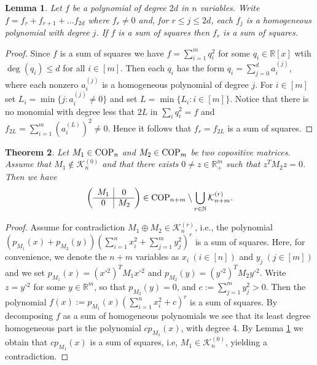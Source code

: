 \documentclass[11pt]{article}
\newcommand{\oR}{{\mathbb R}}
\newtheorem{theorem}{Theorem}[section]
\newtheorem{lemma}[theorem]{Lemma}
\numberwithin{equation}{section}
\newcommand{\COP}{{\text{\rm COP}}}
\newcommand{\MK}{{\mathcal K}}
\begin{document}
\begin{lemma}\label{least-degree} Let $f$ be a polynomial of degree $2d$ in $n$ variables. Write  $f=f_r+f_{r+1}+\dots f_{2d}$ where $f_r\ne 0$ and, for $r\le j\le 2d$, each $f_j$ is a homogeneous polynomial with degree $j$.  If $f$ is a sum of squares then $f_r$ is a sum of squares.
\end{lemma}

\begin{proof}
Since $f$ is a sum of squares we have $f=\sum_{i=1}^{m}q_i^2$ for some $q_i\in \mathbb{R}[x]$ wtih $\deg(q_i)\leq d$ for all $i\in [m]$. Then each $q_i$ has the form 
$q_i=\sum_{j=0}^{d}a_i^{(j)}$, where each nonzero $a_i^{(j)}$ is a homogeneous polynomial of degree $j$. For $i\in [m]$ set $L_i=\min\{ j: a_i^{(j)} \neq 0\} $ and set $L=\min\{L_i:  i\in [m]\}$. Notice that there is no monomial with degree less that $2L$  in $\sum_iq_i^2=f$ and 
$f_{2L} = \sum_{i=1}^{m}(a_i^{(L)})^2 \neq 0 $. Hence it follows that $f_r=f_{2L}$ is a sum of squares. 
\end{proof}


\begin{theorem}\label{theo-cop}
Let $M_1\in \COP_n$ and $M_2\in \COP_m$ be two copositive matrices. Assume that $M_1\notin \MK_n^{(0)}$ and that there exists $0\neq z\in \mathbb{R}^m_+$ such that $z^TM_2z=0$. Then  we have
\begin{equation}
\left(
\begin{array}{c|c}
M_1 & 0\\
\hline
0 & M_2
\end{array}
\right) \in \COP_{n+m} \setminus \bigcup\limits_{r\in \mathbb{N}}\MK_{n+m}^{(r)}.
\end{equation}
\end{theorem} 
\begin{proof}
Assume for contradiction $M_1\oplus M_2\in\MK^{(r)}_n$, i.e., the polynomial $(p_{M_1}(x) + p_{M_2}(y))(\sum_{i=1}^{n}x_i^2 + \sum_{j=1}^{m}y_j^2)^r$ is a sum of squares. Here, for convenience, we denote the $n+m$ variables as $x_i\ (i\in [n])$ and $y_j\ (j\in [m])$ and we set $p_{M_1}(x)= (x^{\circ 2})^T M_1x^{\circ 2}$ and $p_{M_2}(y)=(y^{\circ 2})^T M_2y^{\circ 2}$.
Write $z=y^{\circ2}$ for some $y\in \oR^m$, so that $p_{M_2}(y)=0$, and  $c:=\sum_{j=1}^m y_j^2>0$.
 Then  the polynomial $f(x):=p_{M_1}(x)(\sum_{i=1}^{n}x_i^2 + c)^r$ is a sum of squares.
 By decomposing $f$ as a sum of  homogeneous polynomials we see that its least degree homogeneous part is the polynomial $cp_{M_1}(x)$, with  degree 4. By Lemma \ref{least-degree} we obtain that $cp_{M_1}(x)$ is a sum of squares, i.e, $M_1\in \MK_n^{(0)}$, yielding a contradiction.
\end{proof}
\end{document}
